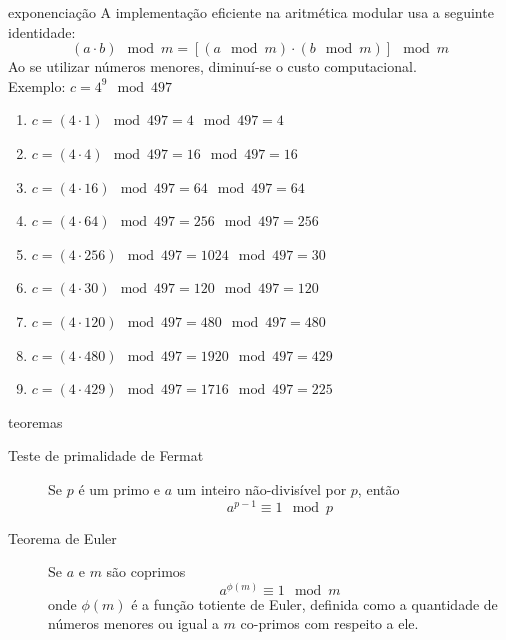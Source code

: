 \begin{frame}[allowframebreaks]
\framebreak
\begin{block}{exponenciação}
A implementação eficiente na aritmética modular usa a seguinte identidade:
\begin{equation}
  (a \cdot b) \mod m = [(a \mod m) \cdot (b \mod m)] \mod m
\end{equation}
Ao se utilizar números menores, diminuí-se o custo computacional.\\
Exemplo: $c = 4^{9} \mod 497$
\begin{footnotesize}
\begin{enumerate}
  \setlength{\itemsep}{0pt}
  \item $c = (4 \cdot 1) \mod 497 = 4 \mod 497 = 4$
  \item $c = (4 \cdot 4) \mod 497 = 16 \mod 497 = 16$
  \item $c = (4 \cdot 16) \mod 497 = 64 \mod 497 = 64$
  \item $c = (4 \cdot 64) \mod 497 = 256 \mod 497 = 256$
  \item $c = (4 \cdot 256) \mod 497 = 1024 \mod 497 = 30$
  \item $c = (4 \cdot 30) \mod 497 = 120 \mod 497 = 120$
  \item $c = (4 \cdot 120) \mod 497 = 480 \mod 497 = 480$
  \item $c = (4 \cdot 480) \mod 497 = 1920 \mod 497 = 429$
  \item $c = (4 \cdot 429) \mod 497 = 1716 \mod 497 = 225$
\end{enumerate}
\end{footnotesize}
\end{block}

\framebreak
\begin{block}{teoremas}
\begin{description}
  \item[Teste de primalidade de Fermat] Se $p$ é um primo e $a$ um inteiro não-divisível por $p$, então 
    \begin{equation}
      a^{p-1} \equiv 1 \mod p
    \end{equation}
  \item[Teorema de Euler] Se $a$ e $m$ são coprimos
    \begin{equation}
      a^{\phi(m)} \equiv 1 \mod m
    \end{equation}
    onde $\phi(m)$ é a função totiente de Euler, definida como a quantidade de números menores ou igual a $m$ co-primos com respeito a ele.
\end{description}
\end{block}


\end{frame}
